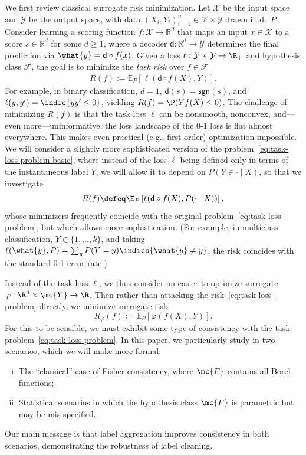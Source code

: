 \documentclass[11pt]{article}
\newcommand{\brk}[1]{\left[{#1}\right]} %
\newcommand{\sgn}{\mathsf{sgn}}  %
\newcommand{\pred}{\mathsf{d}}  %
\newcommand{\dstr}{P}
\newcommand{\sX}{\mathcal{X}} %
\newcommand{\sY}{\mathcal{Y}} %
\newcommand{\tloss}{\ell}  %
\newcommand{\sloss}{\varphi}  %
\begin{document}
We first review classical surrogate risk minimization.
%
Let $\sX$ be the input space and $\sY$ be the output space, with
data $(X_i,Y_i)_{i = 1}^n \in \sX \times \sY$ drawn i.i.d.\ $\dstr$.
%
Consider learning a scoring function $f: \mathcal{X} \to
\mathbb{R}^d$ that maps an input $x \in \sX$ to a score $s \in \mathbb{R}^d$
for some $d \geq 1$, where a decoder $\pred: \mathbb{R}^d \to \sY$
determines the final prediction via $\what{y} = \pred \circ f(x)$.
%
Given a loss $\tloss: \sY \times \mathcal{Y} \to \R_+$ and
hypothesis class $\mathcal{F}$, the goal is to minimize
the \emph{task risk} over $f \in \mathcal{F}$
\begin{align}
  R(f) := \mathbb{E}_P \brk{\tloss(\pred \circ f(X), Y)}.
  \label{eq:task-loss-problem-basic}
\end{align}
For example, in binary classification, $d = 1$,
$\pred(s) = \sgn(s)$, and $\tloss(y, y') = \indic{yy' \le 0}$,
yielding $R(f) = \P(Y f(X) \le 0)$.
%
The challenge of minimizing $R(f)$ is that the task loss $\tloss$ can be
nonsmooth, nonconvex, and---even more---uninformative: the loss landscape of
the $0$-$1$ loss is flat almost everywhere.
%
This makes even practical (e.g., first-order) optimization impossible.
%
We will consider a slightly more sophisticated
version of the problem~\eqref{eq:task-loss-problem-basic},
where instead of the loss $\tloss$ being defined only
in terms of the instantaneous label $Y$, we will allow it to depend
on $P(Y \in \cdot \mid X)$, so that
we investigate
\begin{equation}
  \label{eq:task-loss-problem}
  R(f) \defeq \E_{P}\left[\tloss(\pred \circ f(X), P(\cdot \mid X))
    \right],
\end{equation}
whose minimizers frequently coincide with the original
problem~\eqref{eq:task-loss-problem}, but which allows more sophistication.
%
(For example, in multiclass classification, $Y \in \{1, \ldots, k\}$,
and taking $\tloss(\what{y}, P) = \sum_{y} P(Y = y) \indics{\what{y} \neq
y}$, the risk coincides with the standard 0-1 error rate.)

Instead of the task loss $\tloss$, we thus consider an easier to optimize
surrogate $\sloss: \R^d \times \mc{Y} \to \R$.
%
Then rather than attacking the risk~\eqref{eq:task-loss-problem} directly,
we minimize surrogate risk
\begin{equation*}
  R_\sloss(f) := \mathbb{E}_P \brk{\sloss(f(X), Y)}.
\end{equation*}
For this to be sensible, we must exhibit some type of consistency with the
task problem~\eqref{eq:task-loss-problem}.
%
In this paper, we particularly study in two scenarios, which
we will make more formal:
\begin{enumerate}[(i)]
\item The ``classical'' case of Fisher consistency, where $\mc{F}$ contains
  all Borel functions;
\item Statistical scenarios in which the hypothesis class $\mc{F}$ is
  parametric but may be mis-specified.
\end{enumerate}
%
Our main message is that label aggregation improves
consistency in both scenarios, demonstrating the robustness of label
cleaning.
\end{document}
